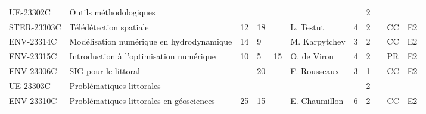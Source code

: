 \documentclass[a4paper,11pt]{article}
\begin{document}
{{\begin{tabular}{lllllllllll}
\rowcolor[HTML]{C0C0C0} 
UE-23302C                      & Outils méthodologiques                        &                           &                           &                           &                                    &                             & 2                           &                                    &                                  &                                  \\
STER-23303C                    & Télédétection spatiale                        & 12                        & 18                        &                           & L. Testut                          & 4                           & 2                           &                                    & CC                               & E2                               \\
ENV-23314C                     & Modélisation numérique en hydrodynamique      & 14                        & 9                         &                           & M. Karpytchev                      & 3                           & 2                           &                                    & CC                               & E2                               \\
ENV-23315C                     & Introduction à l'optimisation numérique       & 10                        & 5                         & 15                        & O. de Viron                        & 4                           & 2                           &                                    & PR                               & E2                               \\
ENV-23306C                     & SIG pour le littoral                          &                           & 20                        &                           & F. Rousseaux                       & 3                           & 1                           &                                    & CC                               & E2                               \\
\rowcolor[HTML]{C0C0C0} 
UE-23303C                      & Problématiques littorales                     &                           &                           &                           &                                    &                             & 2                           &                                    &                                  &                                  \\
ENV-23310C                     & Problématiques littorales en géosciences      & 25                        & 15                        &                           & E. Chaumillon                      & 6                           & 2                           &                                    & CC                               & E2                               \\

\end{tabular}}}
\end{document}
